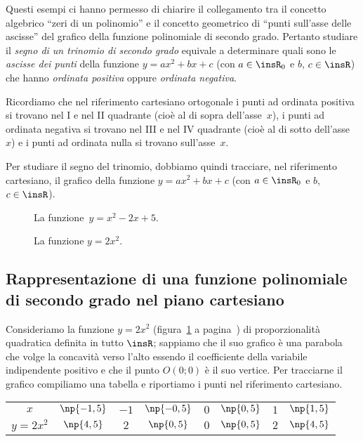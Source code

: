 Questi esempi ci hanno permesso di chiarire il collegamento tra il concetto algebrico ``zeri di un polinomio'' e il concetto geometrico di ``punti sull'asse delle ascisse'' del grafico della funzione polinomiale di secondo grado. Pertanto studiare il \emph{segno di un trinomio di secondo grado} equivale a determinare quali sono le \emph{ascisse dei punti} della funzione $y=ax^2+bx+c$ (con $a\in \insR_{0}$ e $b$, $c\in \insR$) che hanno \emph{ordinata positiva} oppure \emph{ordinata negativa}.

Ricordiamo che nel riferimento cartesiano ortogonale i punti ad ordinata positiva si trovano nel I e nel II quadrante (cioè al di sopra dell'asse~$x$), i punti ad ordinata negativa si trovano nel III e nel IV quadrante (cioè al di sotto dell'asse~$x$) e i punti ad ordinata nulla si trovano sull'asse~$x$.

Per studiare il segno del trinomio, dobbiamo quindi tracciare, nel riferimento cartesiano, il grafico della funzione $y=ax^2+bx+c$ (con $a\in \insR_{0}$ e $b$, $c\in \insR$).

\begin{figure}[b]
 \begin{minipage}[t]{.45\textwidth}
\centering
 
\caption{La funzione~$y=x^{2}-2x+5$.}\label{fig:4.3}
 \end{minipage}\hfil
 \begin{minipage}[t]{.45\textwidth}
\centering
 
\caption{La funzione $y=2x^2$.}\label{fig:4.4}
 \end{minipage}
\end{figure}

\subsection{Rappresentazione di una funzione polinomiale di secondo grado nel piano cartesiano}

Consideriamo la funzione $y=2x^2$ (figura~\ref{fig:4.4} a pagina~\pageref{fig:4.4}) di proporzionalità quadratica definita in tutto $\insR$; sappiamo che il suo grafico è una parabola che volge la concavità verso l'alto essendo il coefficiente della variabile indipendente positivo e che il punto $O(0;0)$ è il suo vertice. Per tracciarne il grafico compiliamo una tabella e riportiamo i punti nel riferimento cartesiano.

\begin{center}
\begin{tabular} {*{8}{c}}
\toprule
$x$      & $\np{-1,5}$ & $-1$ & $\np{-0,5}$ & $0$ & $\np{0,5}$ & $1$ & $\np{1,5}$\\
$y=2x^2$ & $ \np{4,5}$ &  $2$ &  $\np{0,5}$ & $0$ & $\np{0,5}$ & $2$ & $\np{4,5}$\\
\bottomrule
\end{tabular}
\end{center}

